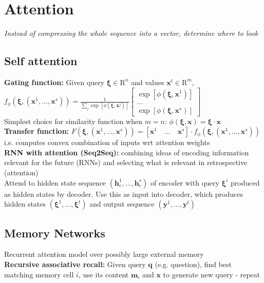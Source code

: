 \section*{Attention} 
\textit{Instead of compressing the whole sequence into a vector, determine where to look}
\subsection*{Self attention}
\textbf{Gating function:} Given query $\pmb\xi\in\mathrm R^n$ and values $\mathbf x^t\in\mathrm R^m$, \\$f_\phi(\pmb\xi, (\mathbf x^1,...,\mathbf x^s))=\frac{1}{\sum_j \exp[\phi(\pmb\xi,\mathbf x^j)]}\begin{bmatrix} \exp[\phi(\pmb\xi,\mathbf x^1)] \\...\\ \exp[\phi(\pmb\xi,\mathbf x^s)] \end{bmatrix}$\\
Simplest choice for similarity function when $m=n$: $\phi(\pmb\xi,\mathbf x)=\pmb\xi\cdot\mathbf x$\\
\textbf{Transfer function:} $F(\pmb\xi, (\mathbf x^1,...,\mathbf x^s))=[\mathbf x^1 \quad ... \quad \mathbf x^s]\cdot f_\phi(\pmb\xi, (\mathbf x^1,...,\mathbf x^s))$\\
i.e. computes convex combination of inputs wrt attention weights\\
\textbf{RNN with attention (Seq2Seq):} combining ideas of encoding information relevant for the future (RNNs) and selecting what is relevant in retrospective (attention)\\
Attend to hidden state sequence $(\mathbf h_e^1,...,\mathbf h_e^s)$ of encoder with query $\pmb\xi^i$ produced as hidden states by decoder. Use this as input into decoder, which produces hidden states $(\pmb\xi^1,...,\pmb\xi^t)$ and output sequence $(\mathbf y^1,...,\mathbf y^t)$ 
\subsection*{Memory Networks}
Recurrent attention model over possibly large external memory\\
\textbf{Recursive associative recall:} Given query $\mathbf q$ (e.g. question), find best matching memory cell $i$, use its content $\mathbf m_i$ and $\mathbf x$ to generate new query - repeat
